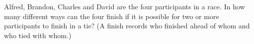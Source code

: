 Alfred, Brandon, Charles and David are the four participants in a race. In how many different ways can the four finish if it is possible for two or more participants to finish in a tie? (A finish records who finished ahead of whom and who tied with whom.)
